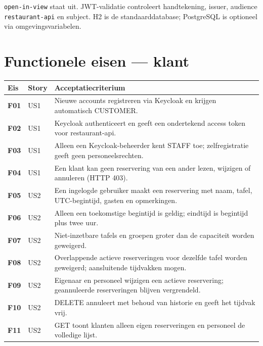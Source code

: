 \documentclass[11pt]{article}
\begin{document}
\texttt{open-in-view} staat uit. JWT-validatie controleert handtekening, issuer,
audience \texttt{restaurant-api} en subject. H2 is de standaarddatabase;
PostgreSQL is optioneel via omgevingsvariabelen.

\section{Functionele eisen --- klant}
\begin{longtable}{@{}>{\bfseries}p{1.2cm}p{1.6cm}p{11.2cm}@{}}
\toprule
Eis & Story & Acceptatiecriterium \\
\midrule
\endhead
F01 & US1 & Nieuwe accounts registreren via Keycloak en krijgen automatisch CUSTOMER. \\
F02 & US1 & Keycloak authenticeert en geeft een ondertekend access token voor restaurant-api. \\
F03 & US1 & Alleen een Keycloak-beheerder kent STAFF toe; zelfregistratie geeft geen personeelsrechten. \\
F04 & US1 & Een klant kan geen reservering van een ander lezen, wijzigen of annuleren (HTTP 403). \\
F05 & US2 & Een ingelogde gebruiker maakt een reservering met naam, tafel, UTC-begintijd, gasten en opmerkingen. \\
F06 & US2 & Alleen een toekomstige begintijd is geldig; eindtijd is begintijd plus twee uur. \\
F07 & US2 & Niet-inzetbare tafels en groepen groter dan de capaciteit worden geweigerd. \\
F08 & US2 & Overlappende actieve reserveringen voor dezelfde tafel worden geweigerd; aansluitende tijdvakken mogen. \\
F09 & US2 & Eigenaar en personeel wijzigen een actieve reservering; geannuleerde reserveringen blijven vergrendeld. \\
F10 & US2 & DELETE annuleert met behoud van historie en geeft het tijdvak vrij. \\
F11 & US2 & GET toont klanten alleen eigen reserveringen en personeel de volledige lijst. \\
\bottomrule
\end{longtable}
\end{document}
